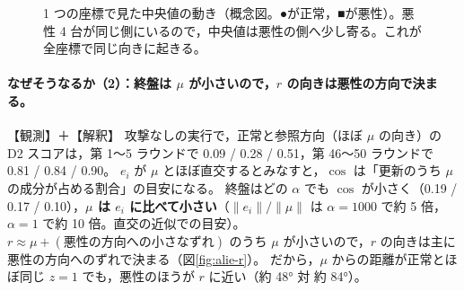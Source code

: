\documentclass[a4j, dvipdfmx]{jsarticle}  %
\begin{document}
\begin{figure}[H]
\centering
{}
\caption{1 つの座標で見た中央値の動き（概念図。●が正常，■が悪性）。悪性 4 台が同じ側にいるので，中央値は悪性の側へ少し寄る。これが全座標で同じ向きに起きる。}
\label{fig:alie-median}
\end{figure}

\paragraph{なぜそうなるか（2）：終盤は $\mu$ が小さいので，$r$ の向きは悪性の方向で決まる。}【観測】＋【解釈】
攻撃なしの実行で，正常と参照方向（ほぼ $\mu$ の向き）の D2 スコアは，第 1〜5 ラウンドで 0.09 / 0.28 / 0.51，第 46〜50 ラウンドで 0.81 / 0.84 / 0.90。
$e_i$ が $\mu$ とほぼ直交するとみなすと，$\cos$ は「更新のうち $\mu$ の成分が占める割合」の目安になる。
終盤はどの $\alpha$ でも $\cos$ が小さく（0.19 / 0.17 / 0.10），\textbf{$\mu$ は $e_i$ に比べて小さい}（$\|e_i\|/\|\mu\|$ は $\alpha = 1000$ で約 5 倍，$\alpha = 1$ で約 10 倍。直交の近似での目安）。
$r \approx \mu + (\text{悪性の方向への小さなずれ})$ のうち $\mu$ が小さいので，$r$ の向きは主に悪性の方向へのずれで決まる（図\ref{fig:alie-r}）。
だから，$\mu$ からの距離が正常とほぼ同じ $z = 1$ でも，悪性のほうが $r$ に近い（約 48° 対 約 84°）。
\end{document}
